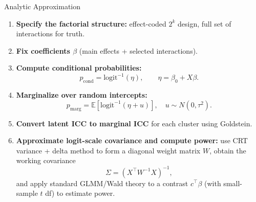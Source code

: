 \documentclass[aspectratio=169]{beamer} %
\begin{document}
\begin{frame}{Analytic Approximation}

\begin{enumerate}
  \item \textbf{Specify the factorial structure:}
        effect-coded $2^k$ design, full set of interactions for truth.
        
  \item \textbf{Fix coefficients $\beta$} (main effects + selected interactions).

  \item \textbf{Compute conditional probabilities:}
        \[
        p_{\text{cond}} = \text{logit}^{-1}(\eta), \qquad
        \eta = \beta_0 + X\beta.
        \]

  \item \textbf{Marginalize over random intercepts:}
        \[
          p_{\text{marg}} = 
          \mathbb{E}\left[ \text{logit}^{-1}(\eta + u) \right],
          \quad u \sim N(0,\tau^2).
        \]

  \item \textbf{Convert latent ICC to marginal ICC} for each cluster using Goldstein.

  \item \textbf{Approximate logit-scale covariance and compute power:}
        use CRT variance + delta method to form a diagonal weight matrix $W$,
        obtain the working covariance
        \[
          \Sigma = (X^\top W^{-1} X)^{-1},
        \]
        and apply standard GLMM/Wald theory to a contrast $c^\top\beta$
        (with small-sample $t$ df) to estimate power.
\end{enumerate}

\end{frame}
\end{document}
